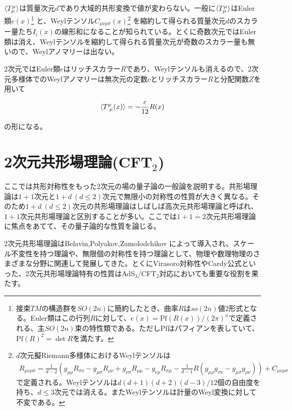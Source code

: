$\langle T^\mu_\mu\rangle$は質量次元$d$であり大域的共形変換で値が変わらない。一般に$\langle T^\mu_\mu\rangle$はEuler類$e(x)
$\footnote{接束$TM$の構造群を$SO(2n)$に簡約したとき、曲率$R$は$so(2n)$値$2$形式となる。Euler類はこの行列$R$に対して、$e(x)=\text{Pf}(R(x))/(2\pi)^n$で定義される、主$SO(2n)$束の特性類である。ただし$\text{Pf}$はパフィアンを表していて、$\text{Pf}(R)^2=\det R$を満たす。}
と、Weylテンソル$C_{\mu\nu\rho\sigma}(x)
$\footnote{$d$次元擬Riemann多様体におけるWeylテンソルは
\begin{align}
R_{\mu\nu\rho\sigma}=\frac{1}{d-2}\left(g_{\mu\rho}R_{\sigma\nu}-g_{\mu\sigma}R_{\rho\nu}+g_{\nu\sigma}R_{\rho\mu}-g_{\nu\rho}R_{\sigma\mu}-\frac{1}{d-1}R(g_{\mu\rho}g_{\sigma\nu}-g_{\mu\sigma}g_{\rho\nu})\right)+C_{\mu\nu\rho\sigma}
\end{align}
で定義される。Weylテンソルは$d(d+1)(d+2)(d-3)/12$個の自由度を持ち、$d\leq 3$次元では消える。またWeylテンソルは計量のWeyl変換に対して不変である。}
を縮約して得られる質量次元$d$のスカラー量たち$I_i(x)$の線形和になることが知られている\cite{Deser:1993yx}。とくに奇数次元ではEuler類は消え、Weylテンソルを縮約して得られる質量次元が奇数のスカラー量も無いので、Weylアノマリーは出ない。

$2$次元ではEuler類$e$はリッチスカラー$R$であり、Weylテンソルも消えるので、$2$次元多様体でのWeylアノマリーは無次元の定数$c$とリッチスカラー$R$と分配関数$Z$を用いて
\begin{oframed}
\begin{align}\label{confanomaly2d}
\langle T^{\mu}_{\ \mu}(x) \rangle=-\frac{c}{12}R(x)
\end{align}
\end{oframed}
の形になる。

\section{2次元共形場理論(CFT$_2$)}\label{sec:2dcft}
ここでは共形対称性をもった2次元の場の量子論の一般論を説明する。共形場理論は$1+1$次元と$1+d\ (d\leq2)$次元で無限小の対称性の性質が大きく異なる。そのため$1+d\ (d\leq2)$次元の共形場理論はしばしば高次元共形場理論と呼ばれ、$1+1$次元共形場理論と区別することが多い。ここでは$1+1=2$次元共形場理論に焦点をあてて、その量子論的な性質を論じる。

2次元共形場理論はBelavin,Polyakov,Zamolodchikov \cite{Polyakov:1970xd}\cite{Belavin:1984vu}によって導入され、スケール不変性を持つ理論や、無限個の対称性を持つ理論として、物理や数理物理のさまざまな分野に関連して発展してきた。とくにVirasoro対称性やCardy公式といった、2次元共形場理論特有の性質はAdS$_3$/CFT$_2$対応においても重要な役割を果たす。

